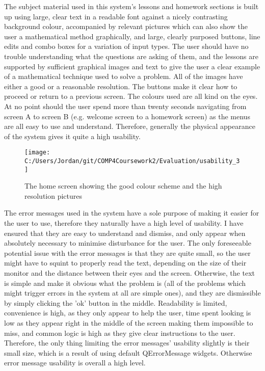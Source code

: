 The subject material used in this system's lessons and homework sections is built up using large, clear text in a readable font against a nicely contrasting background colour, accompanied by relevant pictures which can also show the user a mathematical method graphically, and large, clearly purposed buttons, line edits and combo boxes for a variation of input types. The user should have no trouble understanding what the questions are asking of them, and the lessons are supported by sufficient graphical images and text to give the user a clear example of a mathematical technique used to solve a problem. All of the images have either a good or a reasonable resolution. The buttons make it clear how to proceed or return to a previous screen. The colours used are all kind on the eyes. At no point should the user spend more than twenty seconds navigating from screen A to screen B (e.g. welcome screen to a homework screen) as the menus are all easy to use and understand. Therefore, generally the physical appearance of the system gives it quite a high usability.

\begin{figure}[H]
	\texttt{[image: C:/Users/Jordan/git/COMP4Coursework2/Evaluation/usability\_3]}
	\caption{The home screen showing the good colour scheme and the high resolution pictures}
\end{figure}

The error messages used in the system have a sole purpose of making it easier for the user to use, therefore they naturally have a high level of usability. I have ensured that they are easy to understand and dismiss, and only appear when absolutely necessary to minimise disturbance for the user. The only foreseeable potential issue with the error messages is that they are quite small, so the user might have to squint to properly read the text, depending on the size of their monitor and the distance between their eyes and the screen. Otherwise, the text is simple and make it obvious what the problem is (all of the problems which might trigger errors in the system at all are simple ones), and they are dismissible by simply clicking the 'ok' button in the middle. Readability is limited, convenience is high, as they only appear to help the user, time spent looking is low as they appear right in the middle of the screen making them impossible to miss, and common logic is high as they give clear instructions to the user. Therefore, the only thing limiting the error messages' usability slightly is their small size, which is a result of using default QErrorMessage widgets. Otherwise error message usability is overall a high level.


